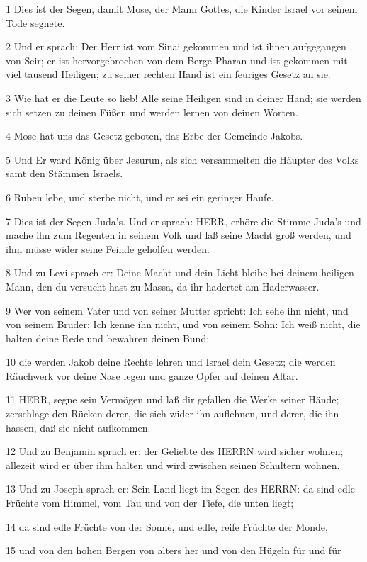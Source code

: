 \par 1 Dies ist der Segen, damit Mose, der Mann Gottes, die Kinder Israel vor seinem Tode segnete.
\par 2 Und er sprach: Der Herr ist vom Sinai gekommen und ist ihnen aufgegangen von Seir; er ist hervorgebrochen von dem Berge Pharan und ist gekommen mit viel tausend Heiligen; zu seiner rechten Hand ist ein feuriges Gesetz an sie.
\par 3 Wie hat er die Leute so lieb! Alle seine Heiligen sind in deiner Hand; sie werden sich setzen zu deinen Füßen und werden lernen von deinen Worten.
\par 4 Mose hat uns das Gesetz geboten, das Erbe der Gemeinde Jakobs.
\par 5 Und Er ward König über Jesurun, als sich versammelten die Häupter des Volks samt den Stämmen Israels.
\par 6 Ruben lebe, und sterbe nicht, und er sei ein geringer Haufe.
\par 7 Dies ist der Segen Juda's. Und er sprach: HERR, erhöre die Stimme Juda's und mache ihn zum Regenten in seinem Volk und laß seine Macht groß werden, und ihm müsse wider seine Feinde geholfen werden.
\par 8 Und zu Levi sprach er: Deine Macht und dein Licht bleibe bei deinem heiligen Mann, den du versucht hast zu Massa, da ihr hadertet am Haderwasser.
\par 9 Wer von seinem Vater und von seiner Mutter spricht: Ich sehe ihn nicht, und von seinem Bruder: Ich kenne ihn nicht, und von seinem Sohn: Ich weiß nicht, die halten deine Rede und bewahren deinen Bund;
\par 10 die werden Jakob deine Rechte lehren und Israel dein Gesetz; die werden Räuchwerk vor deine Nase legen und ganze Opfer auf deinen Altar.
\par 11 HERR, segne sein Vermögen und laß dir gefallen die Werke seiner Hände; zerschlage den Rücken derer, die sich wider ihn auflehnen, und derer, die ihn hassen, daß sie nicht aufkommen.
\par 12 Und zu Benjamin sprach er: der Geliebte des HERRN wird sicher wohnen; allezeit wird er über ihm halten und wird zwischen seinen Schultern wohnen.
\par 13 Und zu Joseph sprach er: Sein Land liegt im Segen des HERRN: da sind edle Früchte vom Himmel, vom Tau und von der Tiefe, die unten liegt;
\par 14 da sind edle Früchte von der Sonne, und edle, reife Früchte der Monde,
\par 15 und von den hohen Bergen von alters her und von den Hügeln für und für
